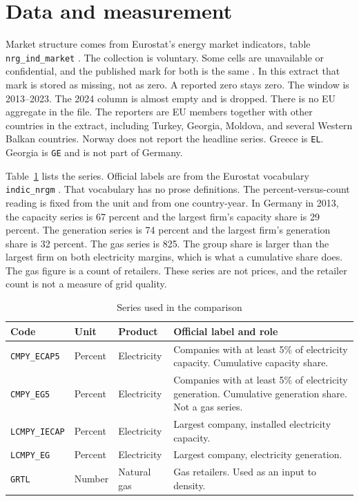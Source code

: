 \documentclass[11pt,a4paper]{article}
\begin{document}
\section{Data and measurement}
\label{sec:data}

Market structure comes from Eurostat's energy market indicators, table \texttt{nrg\_ind\_market} \citep{eurostat2026market}. The collection is voluntary. Some cells are unavailable or confidential, and the published mark for both is the same \citep{eurostat2025explained}. In this extract that mark is stored as missing, not as zero. A reported zero stays zero. The window is 2013--2023. The 2024 column is almost empty and is dropped. There is no EU aggregate in the file. The reporters are EU members together with other countries in the extract, including Turkey, Georgia, Moldova, and several Western Balkan countries. Norway does not report the headline series. Greece is \texttt{EL}. Georgia is \texttt{GE} and is not part of Germany.

Table~\ref{tab:series} lists the series. Official labels are from the Eurostat vocabulary \texttt{indic\_nrgm} \citep{eea2021indic}. That vocabulary has no prose definitions. The percent-versus-count reading is fixed from the unit and from one country-year. In Germany in 2013, the capacity series is 67 percent and the largest firm's capacity share is 29 percent. The generation series is 74 percent and the largest firm's generation share is 32 percent. The gas series is 825. The group share is larger than the largest firm on both electricity margins, which is what a cumulative share does. The gas figure is a count of retailers. These series are not prices, and the retailer count is not a measure of grid quality.

\begin{table}[ht]
\centering
\caption{Series used in the comparison}
\label{tab:series}
\begin{tabular}{@{}lllp{6.4cm}@{}}
\toprule
Code & Unit & Product & Official label and role \\
\midrule
\texttt{CMPY\_ECAP5} & Percent & Electricity & Companies with at least 5\% of electricity capacity. Cumulative capacity share. \\
\texttt{CMPY\_EG5} & Percent & Electricity & Companies with at least 5\% of electricity generation. Cumulative generation share. Not a gas series. \\
\texttt{LCMPY\_IECAP} & Percent & Electricity & Largest company, installed electricity capacity. \\
\texttt{LCMPY\_EG} & Percent & Electricity & Largest company, electricity generation. \\
\texttt{GRTL} & Number & Natural gas & Gas retailers. Used as an input to density. \\
\bottomrule
\end{tabular}
\end{table}
\end{document}
